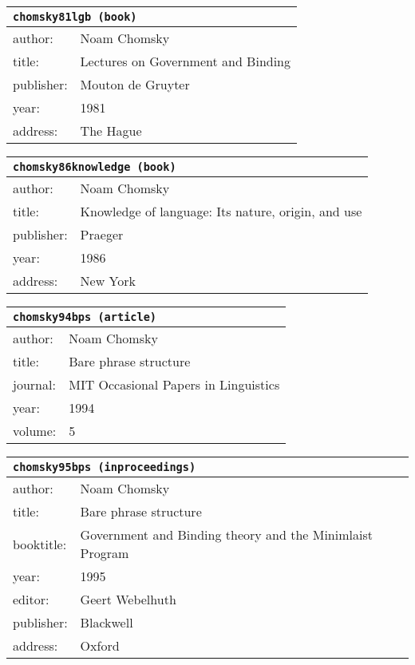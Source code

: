 \documentclass{article}
\begin{document}
\bigskip

\begin{tabular}{p{}p{}}
\multicolumn{2}{l}{\texttt{chomsky81lgb (book)}}\\
\hline
author: & Noam Chomsky\\
title: & Lectures on Government and Binding\\
publisher: & Mouton de Gruyter\\
year: & 1981\\
address: & The Hague\\
\end{tabular}

\bigskip

\begin{tabular}{p{}p{}}
\multicolumn{2}{l}{\texttt{chomsky86knowledge (book)}}\\
\hline
author: & Noam Chomsky\\
title: & Knowledge of language: Its nature, origin, and use\\
publisher: & Praeger\\
year: & 1986\\
address: & New York\\
\end{tabular}

\bigskip

\begin{tabular}{p{}p{}}
\multicolumn{2}{l}{\texttt{chomsky94bps (article)}}\\
\hline
author: & Noam Chomsky\\
title: & Bare phrase structure\\
journal: & MIT Occasional Papers in Linguistics\\
year: & 1994\\
volume: & 5\\
\end{tabular}

\bigskip

\begin{tabular}{p{}p{}}
\multicolumn{2}{l}{\texttt{chomsky95bps (inproceedings)}}\\
\hline
author: & Noam Chomsky\\
title: & Bare phrase structure\\
booktitle: & Government and Binding theory and the Minimlaist Program\\
year: & 1995\\
editor: & Geert Webelhuth\\
publisher: & Blackwell\\
address: & Oxford\\
\end{tabular}
\end{document}
